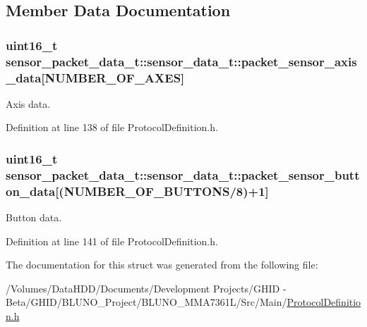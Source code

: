 \subsection{\-Member \-Data \-Documentation}
\hypertarget{structsensor__packet__data__t_1_1sensor__data__t_a755dff8cc9fcb35995098d8deb79fc9b}{
\subsubsection[{packet\-\_\-sensor\-\_\-axis\-\_\-data}]{\setlength{\rightskip}{0pt plus 5cm}uint16\-\_\-t {\bf sensor\-\_\-packet\-\_\-data\-\_\-t\-::sensor\-\_\-data\-\_\-t\-::packet\-\_\-sensor\-\_\-axis\-\_\-data}\mbox{[}{\bf \-N\-U\-M\-B\-E\-R\-\_\-\-O\-F\-\_\-\-A\-X\-E\-S}\mbox{]}}}\label{structsensor__packet__data__t_1_1sensor__data__t_a755dff8cc9fcb35995098d8deb79fc9b}


\-Axis data. 



\-Definition at line 138 of file \-Protocol\-Definition.\-h.

\hypertarget{structsensor__packet__data__t_1_1sensor__data__t_a6baa8757af57519544c5961b73bdad73}{
\subsubsection[{packet\-\_\-sensor\-\_\-button\-\_\-data}]{\setlength{\rightskip}{0pt plus 5cm}uint16\-\_\-t {\bf sensor\-\_\-packet\-\_\-data\-\_\-t\-::sensor\-\_\-data\-\_\-t\-::packet\-\_\-sensor\-\_\-button\-\_\-data}\mbox{[}({\bf \-N\-U\-M\-B\-E\-R\-\_\-\-O\-F\-\_\-\-B\-U\-T\-T\-O\-N\-S}/8)+1\mbox{]}}}\label{structsensor__packet__data__t_1_1sensor__data__t_a6baa8757af57519544c5961b73bdad73}


\-Button data. 



\-Definition at line 141 of file \-Protocol\-Definition.\-h.



\-The documentation for this struct was generated from the following file\-:\begin{DoxyCompactItemize}
\item 
/\-Volumes/\-Data\-H\-D\-D/\-Documents/\-Development Projects/\-G\-H\-I\-D -\/ Beta/\-G\-H\-I\-D/\-B\-L\-U\-N\-O\-\_\-\-Project/\-B\-L\-U\-N\-O\-\_\-\-M\-M\-A7361\-L/\-Src/\-Main/\hyperlink{_protocol_definition_8h}{\-Protocol\-Definition.\-h}\end{DoxyCompactItemize}
